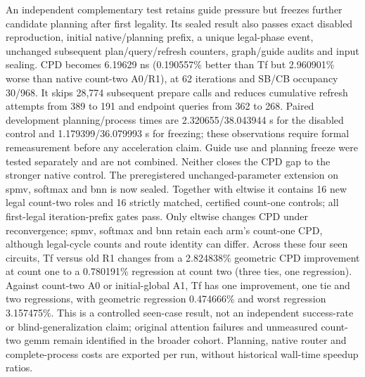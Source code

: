\documentclass[conference,10pt]{IEEEtran}
\begin{document}
An independent complementary test retains guide pressure but freezes further candidate planning after first legality. Its sealed result also passes exact disabled reproduction, initial native/planning prefix, a unique legal-phase event, unchanged subsequent plan/query/refresh counters, graph/guide audits and input sealing. CPD becomes 6.19629 ns (0.190557\% better than Tf but 2.960901\% worse than native count-two A0/R1), at 62 iterations and SB/CB occupancy 30/968. It skips 28,774 subsequent prepare calls and reduces cumulative refresh attempts from 389 to 191 and endpoint queries from 362 to 268. Paired development planning/process times are 2.320655/38.043944 s for the disabled control and 1.179399/36.079993 s for freezing; these observations require formal remeasurement before any acceleration claim. Guide use and planning freeze were tested separately and are not combined. Neither closes the CPD gap to the stronger native control. The preregistered unchanged-parameter extension on spmv, softmax and bnn is now sealed. Together with eltwise it contains 16 new legal count-two roles and 16 strictly matched, certified count-one controls; all first-legal iteration-prefix gates pass. Only eltwise changes CPD under reconvergence; spmv, softmax and bnn retain each arm's count-one CPD, although legal-cycle counts and route identity can differ. Across these four seen circuits, Tf versus old R1 changes from a 2.824838\% geometric CPD improvement at count one to a 0.780191\% regression at count two (three ties, one regression). Against count-two A0 or initial-global A1, Tf has one improvement, one tie and two regressions, with geometric regression 0.474666\% and worst regression 3.157475\%. This is a controlled seen-case result, not an independent success-rate or blind-generalization claim; original attention failures and unmeasured count-two gemm remain identified in the broader cohort. Planning, native router and complete-process costs are exported per run, without historical wall-time speedup ratios.

\end{document}
